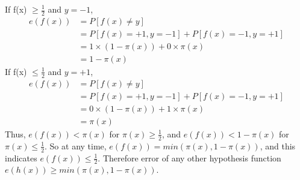 \documentclass[11pt]{article}
\begin{document}
If f(x) $\geq \frac{1}{2}$ and $y = -1$,  
\[
\begin{aligned}
	e(f(x)) &= P[f(x)\neq y]\\
	&= P[f(x) = +1, y=-1]+P[f(x) = -1, y=+1]\\
	&= 1\times(1-\pi(x))+0\times\pi(x)\\
	&= 1-\pi(x)
\end{aligned}
\]
If f(x) $\leq \frac{1}{2}$ and $y = +1$, 
\[
\begin{aligned}
	e(f(x)) &= P[f(x)\neq y]\\
	&= P[f(x) = +1, y=-1]+P[f(x) = -1, y=+1]\\
	&= 0\times(1-\pi(x))+1\times\pi(x)\\
	&= \pi(x)
\end{aligned}
\]
Thus, $e(f(x)) < \pi(x)$ for $\pi(x) \geq \frac{1}{2}$, and $e(f(x)) < 1-\pi(x)$ for $\pi(x) \leq \frac{1}{2}$. So at any time, $e(f(x))=min(\pi(x),1-\pi(x))$, and this indicates $e(f(x))\leq\frac{1}{2}$. Therefore error of any other hypothesis function $e(h(x))\geq min(\pi(x), 1-\pi(x))$.
\newpage
{}
\end{document}
